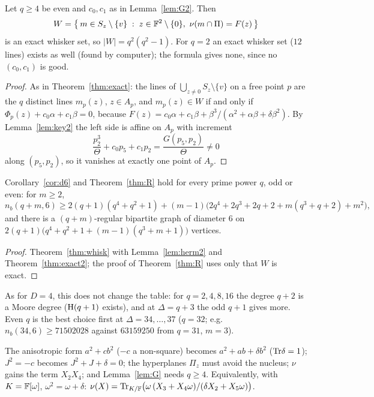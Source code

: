 \begin{theorem}\label{thm:exact2}
Let $q\ge4$ be even and $c_0,c_1$ as in Lemma~\ref{lem:G2}. Then
\[
W=\bigl\{\,m\in S_z\setminus\{v\}\;:\;z\in\F^2\setminus\{0\},\ \nu(m\cap\Pi)=F(z)\,\bigr\}
\]
is an exact whisker set, so $|W|=q^2(q^2-1)$. For $q=2$ an exact whisker set ($12$ lines) exists as well (found by computer); the formula gives none, since no $(c_0,c_1)$ is good.
\end{theorem}

\begin{proof}
As in Theorem~\ref{thm:exact}: the lines of $\bigcup_{z\ne0}S_z\setminus\{v\}$ on a free point $p$ are the $q$ distinct lines $m_p(z)$, $z\in A_p$, and $m_p(z)\in W$ if and only if $\Phi_p(z)+c_0\alpha+c_1\beta=0$, because $F(z)=c_0\alpha+c_1\beta+\beta^3/(\alpha^2+\alpha\beta+\delta\beta^2)$. By Lemma~\ref{lem:key2} the left side is affine on $A_p$ with increment
\[
\frac{p_2^3}{\Theta}+c_0p_5+c_1p_2=\frac{G(p_5,p_2)}{\Theta}\ne0
\]
along $(p_5,p_2)$, so it vanishes at exactly one point of $A_p$.
\end{proof}

\begin{corollary}\label{cor:even6}
Corollary~\ref{cor:d6} and Theorem~\ref{thm:R} hold for every prime power $q$, odd or even: for $m\ge2$,
\[
n_b(q+m,6)\ge2(q+1)(q^4+q^2+1)+(m-1)\bigl(2q^4+2q^3+2q+2+m(q^3+q+2)+m^2\bigr),
\]
and there is a $(q+m)$-regular bipartite graph of diameter $6$ on $2(q+1)\bigl(q^4+q^2+1+(m-1)(q^3+m+1)\bigr)$ vertices.
\end{corollary}

\begin{proof}
Theorem~\ref{thm:whisk} with Lemma~\ref{lem:herm2} and Theorem~\ref{thm:exact2}; the proof of Theorem~\ref{thm:R} uses only that $W$ is exact.
\end{proof}

As for $D=4$, this does not change the table: for $q=2,4,8,16$ the degree $q+2$ is a Moore degree ($\mathrm{H}(q+1)$ exists), and at $\Delta=q+3$ the odd $q+1$ gives more. Even $q$ is the best choice first at $\Delta=34,\dots,37$ ($q=32$; e.g.\ $n_b(34,6)\ge 71502028$ against $63159250$ from $q=31$, $m=3$).

\begin{remark}
The anisotropic form $a^2+cb^2$ ($-c$ a non-square) becomes $a^2+ab+\delta b^2$ ($\mathrm{Tr}\delta=1$); $J^2=-c$ becomes $J^2+J+\delta=0$; the hyperplanes $\Pi_z$ must avoid the nucleus; $\nu$ gains the term $X_2X_4$; and Lemma~\ref{lem:G} needs $q\ge4$. Equivalently, with $K=\mathbb{F}[\omega]$, $\omega^2=\omega+\delta$: $\nu(X)=\mathrm{Tr}_{K/\mathbb{F}}\bigl(\omega\,(X_3+X_4\omega)/(\delta X_2+X_5\omega)\bigr)$.
\end{remark}

